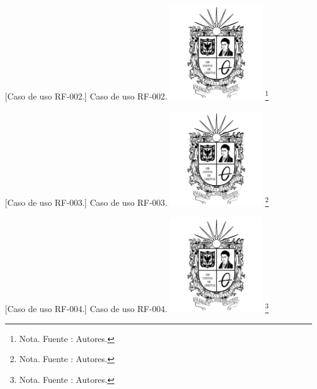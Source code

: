 {    \vspace{2mm}
    \begin{minipage}{0.9\textwidth}
    \centering
    [{Caso de uso RF-002.}]{ Caso de uso RF-002. }
    \label{caso2}
    \includegraphics[width=0.3\textwidth]{Content/Images/Escudo_UD.png}
    \footnote{Nota. \textup{Fuente : Autores.}}
    \end{minipage}
    
    \vspace{2mm}
    \begin{minipage}{0.9\textwidth}
    \centering
    [{Caso de uso RF-003.}]{ Caso de uso RF-003. }
    \label{caso3}
    \includegraphics[width=0.3\textwidth]{Content/Images/Escudo_UD.png}
    \footnote{Nota. \textup{Fuente : Autores.}}
    \end{minipage}
    
    \vspace{2mm}
    \begin{minipage}{0.9\textwidth}
    \centering
    [{Caso de uso RF-004.}]{ Caso de uso RF-004. }
    \label{caso4}
    \includegraphics[width=0.3\textwidth]{Content/Images/Escudo_UD.png}
    \footnote{Nota. \textup{Fuente : Autores.}}
    \end{minipage}
    
}
